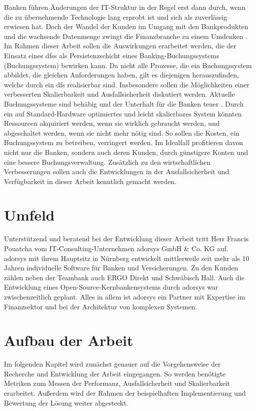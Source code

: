 \documentclass[12pt,oneside,a4paper,parskip]{scrbook}
\begin{document}
Banken führen Änderungen der IT-Struktur in der Regel erst dann durch, wenn die zu übernehmende Technologie lang erprobt ist und sich als zuverlässig erwiesen hat. Doch der Wandel der Kunden im Umgang mit den Bankprodukten und die wachsende Datenmenge zwingt die Finanzbranche zu einem Umdenken \cite{bigdataBigStorage}. Im Rahmen dieser Arbeit sollen die Auswirkungen erarbeitet werden, die der Einsatz eines \acp{dfs} als Persistenzschicht eines Banking-Buchungssystems (Buchungssystem) bewirken kann. Da nicht alle Prozesse, die ein Buchungssystem abbildet, die gleichen Anforderungen haben, gilt es diejenigen herauszufinden, welche durch ein \ac{dfs} realisierbar sind. Insbesondere sollen die Möglichkeiten einer verbesserten Skalierbarkeit und Ausfallsicherheit diskutiert werden. Aktuelle Buchungssysteme sind behäbig und der Unterhalt für die Banken teuer \cite{bankingsCosts}. Durch ein auf Standard-Hardware optimiertes und leicht skalierbares System könnten Ressourcen akquiriert werden, wenn sie wirklich gebraucht werden, und abgeschaltet werden, wenn sie nicht mehr nötig sind. So sollen die Kosten, ein Buchungssystem zu betreiben, verringert werden. Im Idealfall profitieren davon nicht nur die Banken, sondern auch deren Kunden, durch günstigere Konten und eine bessere Buchungsverwaltung. Zusätzlich zu den wirtschaftlichen Verbesserungen sollen auch die Entwicklungen in der Ausfallsicherheit und Verfügbarkeit in dieser Arbeit kenntlich gemacht werden.

\section{Umfeld}
Unterstützend und beratend bei der Entwicklung dieser Arbeit tritt Herr Francis Pouatcha vom IT-Consulting-Unternehmen adorsys GmbH \& Co. KG auf. adorsys mit ihrem Hauptsitz in Nürnberg entwickelt mittlerweile seit mehr als 10 Jahren individuelle Software für Banken und Versicherungen. Zu den Kunden zählen neben der Teambank auch ERGO Direkt und Schwäbisch Hall. Auch die Entwicklung eines Open-Source-Kernbankensystems durch adorsys war zwischenzeitlich geplant. Alles in allem ist adorsys ein Partner mit Expertise im Finanzsektor und bei der Architektur von komplexen Systemen.

\section{Aufbau der Arbeit}
Im folgenden Kapitel wird zunächst genauer auf die Vorgehensweise der Recherche und Entwicklung der Arbeit eingegangen. So werden benötigte Metriken zum Messen der Performanz, Ausfallsicherheit und Skalierbarkeit erarbeitet. Außerdem wird der Rahmen der beispielhaften Implementierung und Bewertung der Lösung weiter abgesteckt.
\end{document}
